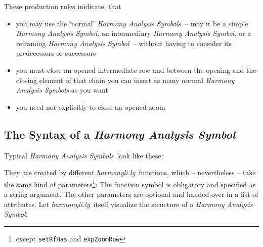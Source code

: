 \documentclass[
  DIV=calc,
  BCOR=5mm,
  12pt,
  headings=small,
  oneside,
  abstract=true,
  toc=bib,
  xcolor=dvipsnames,
  openany,
  english]{scrartcl}
\newcommand{\hlyn}[0]{\textit{harmonyli.ly}}
\newcommand{\has}[1]{\textit{Harmony Analysis Symbol#1}}
\begin{document}
These production rules inidicate, that
\begin{itemize}
  \item you may use the 'normal' \has{s}\ -- may it be a simple \has, an
  intermediary \has, or a reframing \has\ -- without having to consider its
  predecessors or successors
  \item you must close an opened intermediate row and between the opening and
  the closing element of that chain you can insert as many normal \has{s} as you
  want
  \item you need not explicitly to close an opened zoom
\end{itemize}


\subsection{The Syntax of a \has{}}

Typical \has{s}\ look like these:

\begin{center}
\end{center}

They are created by different \hlyn\ functions, which -- nevertheless -- take
the same kind of parameters\footnote{except \texttt{setRfHas} and
\texttt{expZoomRow}}: The function symbol is obligatory and specified as a string
argument. The other parameters are optional and handed over in a list of
attributes. Let \hlyn\ itself visualize the structure of a \has{}:
\end{document}
